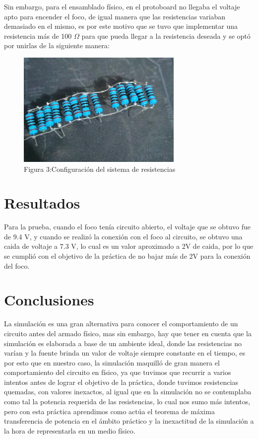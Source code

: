 \documentclass[]{article}
\begin{document}
Sin embargo, para el ensamblado físico, en el protoboard no llegaba el voltaje apto para encender el foco, de igual manera que las resistencias variaban demasiado en el mismo, es 
por este motivo que se tuvo que implementar una resistencia más de 100 $\Omega$ para que pueda llegar a la resistencia deseada y se optó por unirlas de la siguiente manera:

\begin{figure}[htb]
    \centering
    \includegraphics[width=8cm]{build/Imagenes/Resistencias.jpg}
    \caption{Figura 3:Configuración del sistema de resistencias}
\end{figure}

\section{Resultados}

Para la prueba, cuando el foco tenía circuito abierto, el voltaje que se obtuvo fue de 9.4 V, y cuando se realizó la conexión con el foco al circuito, se obtuvo una caida de voltaje
a 7.3 V, lo cual es un valor aproximado a 2V de caida, por lo que se cumplió con el objetivo de la práctica de no bajar más de 2V para la conexión del foco.

\section{Conclusiones}

La simulación es una gran alternativa para conocer el comportamiento de un circuito antes del armado físico, mas sin embargo, hay que tener en cuenta que la simulación es 
elaborada a base de un ambiente ideal, donde las resistencias no varían y la fuente brinda un valor de voltaje siempre constante en el tiempo, es por esto que en nuestro caso, 
la simulación maquilló de gran manera el comportamiento del circuito en físico, ya que tuvimos que recurrir a varios intentos antes de lograr el objetivo de la práctica, donde
tuvimos resistencias quemadas, con valores inexactos, al igual que en la simulación no se contemplaba como tal la potencia requerida de las resistencias, lo cual nos sumo más 
intentos, pero con esta práctica aprendimos como actúa el teorema de máxima transferencia de potencia en el ámbito práctico y la inexactitud de la simulación a la hora de representarla
en un medio físico.
\end{document}
